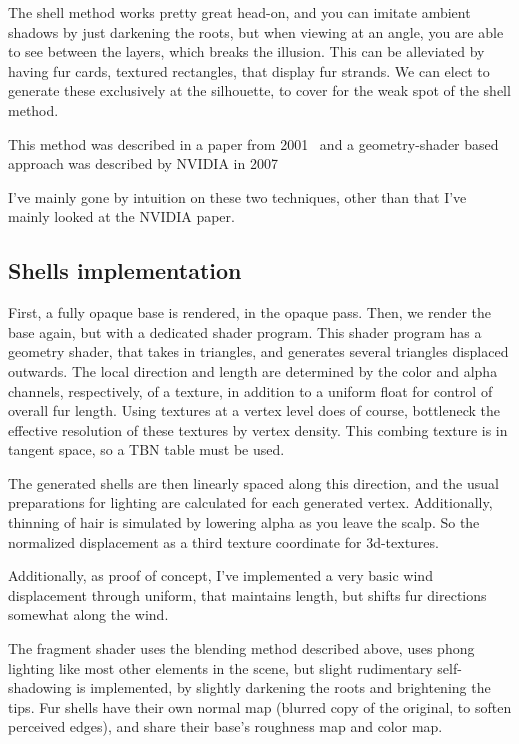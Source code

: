 \documentclass[a4paper, 12pt]{article}
\begin{document}
    The shell method works pretty great head-on,
    and you can imitate ambient shadows by just darkening the roots,
    but when viewing at an angle, you are able to see between the layers,
    which breaks the illusion.
    This can be alleviated by having fur cards, textured rectangles,
    that display fur strands.
    We can elect to generate these exclusively at the silhouette,
    to cover for the weak spot of the shell method.

    This method was described in a paper from 2001~\cite{Lengyel:2001:RFO}
    and a geometry-shader based approach was described by NVIDIA in 2007
    ~\cite{nvidiafur,nvidiasamples}

    I've mainly gone by intuition on these two techniques,
    other than that I've mainly looked at the NVIDIA paper.

    \subsection{Shells implementation}

    First, a fully opaque base is rendered,
    in the opaque pass.
    Then, we render the base again,
    but with a dedicated shader program.
    This shader program has a geometry shader,
    that takes in triangles,
    and generates several triangles displaced outwards.
    The local direction and length
    are determined by the color and alpha channels,
    respectively, of a texture,
    in addition to a uniform float for control of overall fur length.
    Using textures at a vertex level does of course,
    bottleneck the effective resolution of these textures by vertex density.
    This combing texture is in tangent space, so a TBN table must be used.

    The generated shells are then linearly spaced along this direction,
    and the usual preparations for lighting
    are calculated for each generated vertex.
    Additionally,
    thinning of hair is simulated by lowering alpha as you leave the scalp.
    So the normalized displacement as a third texture coordinate for 3d-textures.

    Additionally, as proof of concept,
    I've implemented a very basic wind displacement
    through uniform, that maintains length,
    but shifts fur directions somewhat along the wind.

    The fragment shader uses the blending method described above,
    uses phong lighting like most other elements in the scene,
    but slight rudimentary self-shadowing is implemented,
    by slightly darkening the roots and brightening the tips.
    Fur shells have their own normal map (blurred copy of the original,
    to soften perceived edges),
    and share their base's roughness map and color map.
\end{document}
